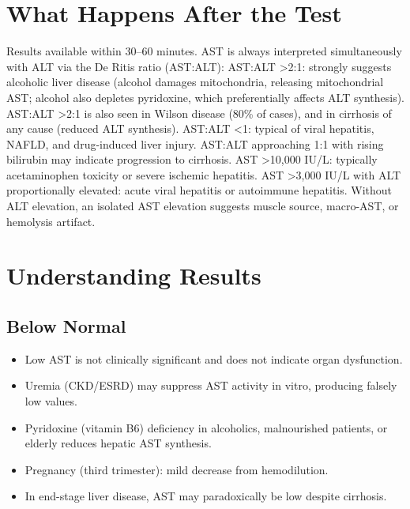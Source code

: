 \section*{What Happens After the Test}
Results available within 30--60 minutes. AST is always interpreted simultaneously with ALT via the De Ritis ratio (AST:ALT): AST:ALT >2:1: strongly suggests alcoholic liver disease (alcohol damages mitochondria, releasing mitochondrial AST; alcohol also depletes pyridoxine, which preferentially affects ALT synthesis). AST:ALT >2:1 is also seen in Wilson disease (80\% of cases), and in cirrhosis of any cause (reduced ALT synthesis). AST:ALT <1: typical of viral hepatitis, NAFLD, and drug-induced liver injury. AST:ALT approaching 1:1 with rising bilirubin may indicate progression to cirrhosis. AST >10,000 IU/L: typically acetaminophen toxicity or severe ischemic hepatitis. AST >3,000 IU/L with ALT proportionally elevated: acute viral hepatitis or autoimmune hepatitis. Without ALT elevation, an isolated AST elevation suggests muscle source, macro-AST, or hemolysis artifact.

\section*{Understanding Results}

\subsection*{Below Normal}
\begin{itemize}
  \item Low AST is not clinically significant and does not indicate organ dysfunction.
  \item Uremia (CKD/ESRD) may suppress AST activity in vitro, producing falsely low values.
  \item Pyridoxine (vitamin B6) deficiency in alcoholics, malnourished patients, or elderly reduces hepatic AST synthesis.
  \item Pregnancy (third trimester): mild decrease from hemodilution.
  \item In end-stage liver disease, AST may paradoxically be low despite cirrhosis.
\end{itemize}

